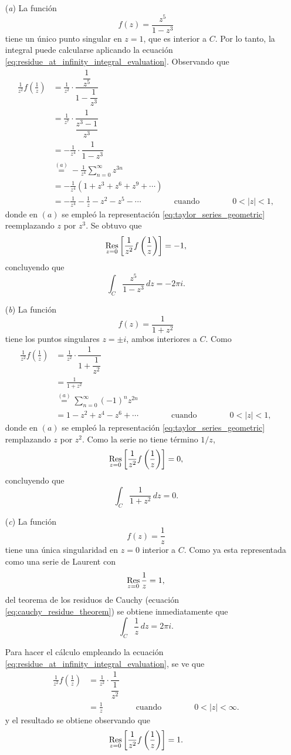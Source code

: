 \documentclass[a4paper]{report}
\def\Res{\qopname\relax m{Res}}
\begin{document}
\begin{enumerate}
 \item[(\textit{a})] La función 
 \[
  f(z)=\frac{z^5}{1-z^3}
 \]
 tiene un único punto singular en \(z=1\), que es interior a \(C\). Por lo tanto, la integral puede calcularse aplicando la ecuación \ref{eq:residue_at_infinity_integral_evaluation}. Observando que 
 \begin{align*}
  \frac{1}{z^2}f\left(\frac{1}{z}\right)&=\frac{1}{z^2}\cdot\dfrac{\dfrac{1}{z^5}}{1-\dfrac{1}{z^3}}\\
    &=\frac{1}{z^7}\cdot\dfrac{1}{\dfrac{z^3-1}{z^3}}\\
    &=-\frac{1}{z^4}\cdot\dfrac{1}{1-z^3}\\
    &\overset{(a)}{=}-\frac{1}{z^4}\sum_{n=0}^\infty z^{3n}\\
    &=-\frac{1}{z^4}(1+z^3+z^6+z^9+\cdots)\\
    &=-\frac{1}{z^4}-\frac{1}{z}-z^2-z^5-\cdots
    \qquad\qquad\textrm{cuando}\qquad\qquad
    0<|z|<1,
 \end{align*}
donde en \((a)\) se empleó la representación \ref{eq:taylor_series_geometric} reemplazando \(z\) por \(z^3\). Se obtuvo que 
\[
 \Res_{z=0}\left[\frac{1}{z^2}f\left(\frac{1}{z}\right)\right]=-1,
\]
concluyendo que 
\[
 \int_C\frac{z^5}{1-z^3}\,dz=-2\pi i.
\]
\item[(\textit{b})] La función 
\[
 f(z)=\frac{1}{1+z^2}
\]
tiene los puntos singulares \(z=\pm i\), ambos interiores a \(C\). Como
\begin{align*}
 \frac{1}{z^2}f\left(\frac{1}{z}\right)&=\frac{1}{z^2}\cdot\dfrac{1}{1+\dfrac{1}{z^2}}\\
  &=\frac{1}{1+z^2}\\
  &\overset{(a)}{=}\sum_{n=0}^\infty(-1)^nz^{2n}\\
  &=1-z^2+z^4-z^6+\cdots
  \qquad\qquad\textrm{cuando}\qquad\qquad
  0<|z|<1,
\end{align*}
donde en \((a)\) se empleó la representación \ref{eq:taylor_series_geometric} remplazando \(z\) por \(z^2\). Como la serie no tiene término \(1/z\),
\[
 \Res_{z=0}\left[\frac{1}{z^2}f\left(\frac{1}{z}\right)\right]=0,
\]
concluyendo que 
\[
 \int_C\frac{1}{1+z^2}\,dz=0.
\]
\item[(\textit{c})] La función 
\[
 f(z)=\frac{1}{z}
\]
tiene una única singularidad en \(z=0\) interior a \(C\). Como ya esta representada como una serie de Laurent con 
\[
 \Res_{z=0}\frac{1}{z}=1,
\]
del teorema de los residuos de Cauchy (ecuación \ref{eq:cauchy_residue_theorem}) se obtiene inmediatamente que 
\[
 \int_C\frac{1}{z}\,dz=2\pi i.
\]

Para hacer el cálculo empleando la ecuación \ref{eq:residue_at_infinity_integral_evaluation}, se ve que 
\begin{align*}
 \frac{1}{z^2}f\left(\frac{1}{z}\right)&=\frac{1}{z^2}\cdot\dfrac{1}{\dfrac{1}{z^2}}\\
  &=\frac{1}{z}
  \qquad\qquad\textrm{cuando}\qquad\qquad
  0<|z|<\infty.
\end{align*}
y el resultado se obtiene observando que 
\[
 \Res_{z=0}\left[\frac{1}{z^2}f\left(\frac{1}{z}\right)\right]=1.
\]
\end{enumerate}
\end{document}
